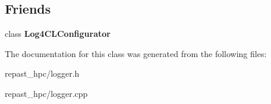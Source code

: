 \subsection*{Friends}
\begin{DoxyCompactItemize}
\item 
\hypertarget{class_log4_c_l_af0e54cc350bb8e25a6a22bf3f38f21c5}{class {\bfseries Log4\-C\-L\-Configurator}}\label{class_log4_c_l_af0e54cc350bb8e25a6a22bf3f38f21c5}

\end{DoxyCompactItemize}


The documentation for this class was generated from the following files\-:\begin{DoxyCompactItemize}
\item 
repast\-\_\-hpc/logger.\-h\item 
repast\-\_\-hpc/logger.\-cpp\end{DoxyCompactItemize}
